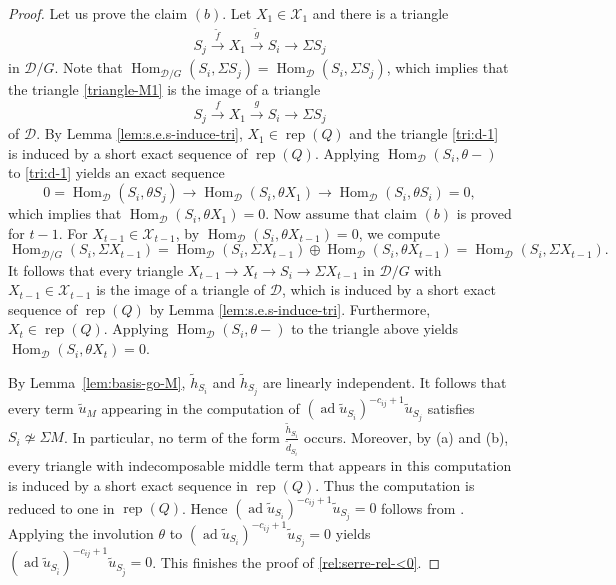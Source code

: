 \documentclass[12pt,reqno]{amsart}
\numberwithin{equation}{section}
\newcommand{\rep}{\operatorname{rep}\nolimits}
\newcommand{\Hom}{\operatorname{Hom}\nolimits}
\begin{document}
\begin{proof}
		Let us prove the claim $(b)$. Let $X_1\in \mathcal{X}_1$ and there is a triangle
		\begin{eqnarray}\label{triangle-M1}
			S_j\stackrel{\tilde{f}}{\longrightarrow}  X_1\stackrel{\tilde{g}}{\longrightarrow} S_i\longrightarrow \Sigma S_j 
		\end{eqnarray}
		in $\mathcal{D}/G$. Note that $\Hom_{\mathcal{D}/G}(S_i,\Sigma S_j)=\Hom_{\mathcal{D}}(S_i,\Sigma S_j)$, which implies that the triangle \eqref{triangle-M1} is the image of a triangle
		\begin{equation}\label{tri:d-1}
			S_j\stackrel{f}{\longrightarrow}  X_1\stackrel{g}{\longrightarrow}  S_i\longrightarrow \Sigma S_j
		\end{equation}
		of $\mathcal{D}$. By Lemma \ref{lem:s.e.s-induce-tri}, $X_1\in \rep(Q)$ and the triangle \eqref{tri:d-1} is induced by a short exact sequence of $\rep(Q)$. Applying $\Hom_{\mathcal{D}}(S_i,\theta-)$ to \eqref{tri:d-1} yields an exact sequence
		\[
		0=\Hom_{\mathcal{D}}(S_i,\theta S_j)\rightarrow \Hom_{\mathcal{D}}(S_i,\theta X_1)\rightarrow \Hom_{\mathcal{D}}(S_i,\theta S_i)=0,
		\]
		which implies that $\Hom_{\mathcal{D}}(S_i,\theta X_1)=0$. Now assume that  claim $(b)$ is proved for $t-1$. For $X_{t-1}\in \mathcal{X}_{t-1}$, by $\Hom_{\mathcal{D}}(S_i,\theta X_{t-1})=0$, we compute \[\Hom_{\mathcal{D}/G}(S_i,\Sigma X_{t-1})=\Hom_{\mathcal{D}}(S_i,\Sigma X_{t-1})\oplus \Hom_{\mathcal{D}}(S_i,\theta X_{t-1})=\Hom_{\mathcal{D}}(S_i,\Sigma X_{t-1}).\]
		It follows that every triangle $X_{t-1}\rightarrow X_t\rightarrow S_i\rightarrow \Sigma X_{t-1}$ in $\mathcal{D}/G$ with $X_{t-1}\in \mathcal{X}_{t-1}$ is the image of a triangle of $\mathcal{D}$, which is induced by a short exact sequence of $\rep(Q)$ by Lemma \ref{lem:s.e.s-induce-tri}. Furthermore, $X_t\in \rep(Q)$. Applying $\Hom_{\mathcal{D}}(S_i,\theta-)$ to the triangle above yields $\Hom_{\mathcal{D}}(S_i,\theta X_t)=0$.
		
		By Lemma~\ref{lem:basis-go-M}, $\tilde{h}_{S_i}$ and $\tilde{h}_{S_j}$
		are linearly independent. It follows that every term $\tilde{u}_M$
		appearing in the computation of
		$(\operatorname{ad}\tilde{u}_{S_i})^{-c_{ij}+1}\tilde{u}_{S_j}$
		satisfies $S_i\not\simeq \Sigma M$. In particular, no term of the form
		$\frac{\tilde{h}_{S_i}}{\tilde{d}_{S_i}}$ occurs. Moreover, by (a) and (b), every triangle with indecomposable middle term
		that appears in this computation is induced by a short exact sequence in
		$\rep(Q)$. Thus the computation is reduced to one in $\rep(Q)$. Hence
		$(\operatorname{ad}\tilde{u}_{S_i})^{-c_{ij}+1}\tilde{u}_{S_j}=0$
		follows from \cite{R90-Hall-poly-rep-fin,PX00-Tri-Cat-Kac}. Applying the involution $\theta$ to $(\operatorname{ad} \tilde{u}_{{S_i}})^{-c_{ij}+1} \tilde{u}_{{S_j}}=0$  yields $(\operatorname{ad} \tilde{u}_{{S_{\bar i}}})^{-c_{ij}+1} \tilde{u}_{{S_{\bar j}}}=0$. This finishes the proof of \eqref{rel:serre-rel-<0}.
		

\end{proof}
\end{document}

